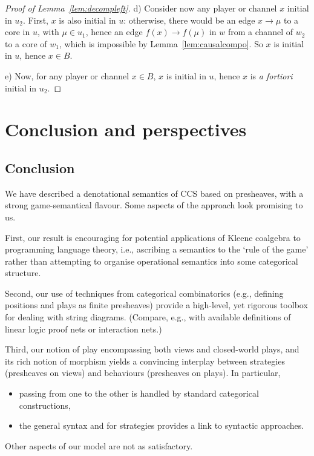 \documentclass{LMCS}
\theoremstyle{plain}\newtheorem{satz}[thm]{Satz}
\begin{document}
\begin{proof}[Proof of Lemma~\ref{lem:decompleft}]
d) Consider now any player or channel $x$ initial in $u_2$. First, $x$ is also
initial in $u$: otherwise, there would be an edge $x \to \mu$ to a
core in $u$, with $\mu \in u_1$, hence an edge $f (x) \to f (\mu)$ in
$w$ from a channel of $w_2$ to a core of $w_1$, which is impossible by
Lemma~\ref{lem:causalcompo}. So $x$ is initial in $u$, hence $x \in
B$.

e) Now, for any player or channel $x \in B$, $x$ is initial in $u$, hence $x$ is
\emph{a fortiori} initial in $u_2$. 
\end{proof}

\section{Conclusion and perspectives}\label{sec:conc}

\subsection{Conclusion}
We have described a denotational semantics of CCS based on presheaves,
with a strong game-semantical flavour. Some aspects of the approach
look promising to us. 

First, our result is encouraging for potential applications of Kleene
coalgebra to programming language theory, i.e., ascribing a semantics
to the `rule of the game' rather than attempting to organise
operational semantics into some categorical structure.

Second, our use of techniques from categorical combinatorics (e.g.,
defining positions and plays as finite presheaves) provide a
high-level, yet rigorous toolbox for dealing with string diagrams.
(Compare, e.g., with available definitions of linear logic proof nets
or interaction nets.)

Third, our notion of play encompassing both views and closed-world
plays, and its rich notion of morphism yields a convincing interplay
between strategies (presheaves on views) and behaviours (presheaves on
plays). In particular,
\begin{itemize}
\item passing from one to the other
is handled by standard categorical constructions,
\item the general syntax and \lts{} for strategies provides a link to
  syntactic approaches.
\end{itemize}

Other aspects of our model are not as satisfactory.
\end{document}
